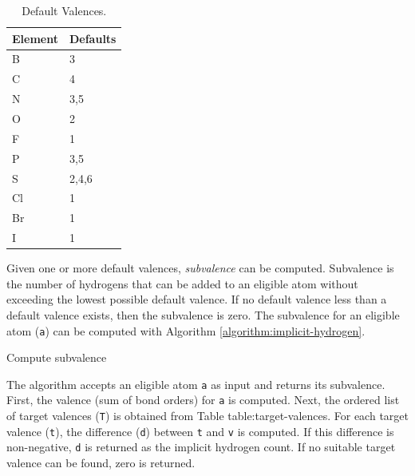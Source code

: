 \documentclass{article}
\def\ttt{\texttt}
\begin{document}
\begin{table}
    \caption{Default Valences.}
    \centering
    \begin{tabular}{l l}
        \hline
        Element & Defaults \\
        \hline
        B & 3 \\
        C & 4 \\
        N & 3,5 \\
        O & 2 \\
        F & 1 \\
        P & 3,5 \\
        S & 2,4,6 \\
        Cl & 1 \\
        Br & 1 \\
        I & 1 \\
        \hline
    \end{tabular}
    \label{table:target-valences}
\end{table}

Given one or more default valences, \textit{subvalence} can be computed. Subvalence is the number of hydrogens that can be added to an eligible atom without exceeding the lowest possible default valence. If no default valence less than a default valence exists, then the subvalence is zero. The subvalence for an eligible atom (\ttt{a}) can be computed with Algorithm \ref{algorithm:implicit-hydrogen}.

\begin{algorithm}
    \caption{Compute subvalence}
    \label{algorithm:implicit-hydrogen}
    
\end{algorithm}

The algorithm accepts an eligible atom \ttt{a} as input and returns its subvalence. First, the valence (sum of bond orders) for \ttt{a} is computed. Next, the ordered list of target valences (\ttt{T}) is obtained from Table {table:target-valences}. For each target valence (\ttt{t}), the difference (\ttt{d}) between \ttt{t} and \ttt{v} is computed. If this difference is non-negative, \ttt{d} is returned as the implicit hydrogen count. If no suitable target valence can be found, zero is returned.
\end{document}
